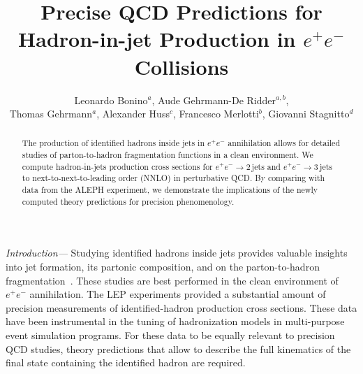 \documentclass[10pt,aps,prl,twocolumn,preprintnumbers,nofootinbib]{revtex4-2}
\begin{document}

\title{\boldmath Precise QCD Predictions for Hadron-in-jet Production in \texorpdfstring{$e^+e^-$}{e+e-} Collisions}

\author{Leonardo Bonino$^a$, Aude Gehrmann-De Ridder$^{a,b}$,\\ Thomas Gehrmann$^a$,
Alexander Huss$^c$, Francesco Merlotti$^b$, Giovanni Stagnitto$^d$}

\begin{abstract}
The production of identified hadrons inside jets in $e^+ e^-$ annihilation allows for detailed studies of parton-to-hadron fragmentation functions in a clean environment.
We compute hadron-in-jets production cross sections for $e^+e^- \to 2\,\mathrm{jets}$ and $e^+e^- \to 3\,\mathrm{jets}$ to next-to-next-to-leading order (NNLO) in perturbative QCD. By comparing with data from the ALEPH experiment, we demonstrate the implications of the newly computed theory predictions for precision phenomenology.
\end{abstract}

\maketitle

\textit{Introduction---}\ignorespaces
Studying identified hadrons inside jets provides valuable insights into jet formation, its partonic composition, and on the parton-to-hadron fragmentation~\cite{Procura:2009vm,Jain:2011xz,Kaufmann:2015hma}.
These studies are best performed in the clean environment of $e^+e^-$ annihilation.
The LEP experiments provided a substantial amount of precision measurements of identified-hadron production cross sections.
These data have been instrumental in the tuning of hadronization models in multi-purpose event simulation programs.
For these data to be equally relevant to precision QCD studies, theory predictions that allow to describe the full kinematics of the final state containing the identified hadron are required.
\end{document}
